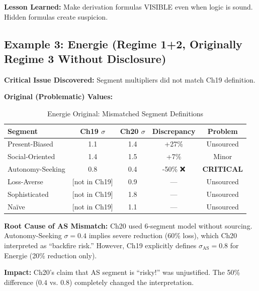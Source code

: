 \textbf{Lesson Learned:} Make derivation formulas VISIBLE even when logic is sound. Hidden formulas create suspicion.

\subsection{Example 3: Energie (Regime 1+2, Originally Regime 3 Without Disclosure)}
\label{subsec:jjj-energie}

\textbf{Critical Issue Discovered:} Segment multipliers did not match Ch19 definition.

\textbf{Original (Problematic) Values:}
\begin{table}[htbp]
\centering
\caption{Energie Original: Mismatched Segment Definitions}
\label{tab:jjj-energie-original-mismatch}
\renewcommand{\arraystretch}{1.3}
\small
\begin{tabular}{@{}lcccc@{}}
\toprule
\textbf{Segment} & \textbf{Ch19 $\sigma$} & \textbf{Ch20 $\sigma$} & \textbf{Discrepancy} & \textbf{Problem} \\
\midrule
Present-Biased & 1.1 & 1.4 & +27\% & Unsourced \\
Social-Oriented & 1.4 & 1.5 & +7\% & Minor \\
Autonomy-Seeking & 0.8 & 0.4 & -50\% ❌ & \textbf{CRITICAL} \\
Loss-Averse & [not in Ch19] & 0.9 & --- & Unsourced \\
Sophisticated & [not in Ch19] & 1.8 & --- & Unsourced \\
Naïve & [not in Ch19] & 1.1 & --- & Unsourced \\
\bottomrule
\end{tabular}
\end{table}

\textbf{Root Cause of AS Mismatch:} Ch20 used 6-segment model without sourcing. Autonomy-Seeking $\sigma = 0.4$ implies severe reduction (60\% loss), which Ch20 interpreted as ``backfire risk.'' However, Ch19 explicitly defines $\sigma_{\text{AS}} = 0.8$ for Energie (20\% reduction only).

\textbf{Impact:} Ch20's claim that AS segment is ``risky!'' was unjustified. The 50\% difference ($0.4$ vs. $0.8$) completely changed the interpretation.

